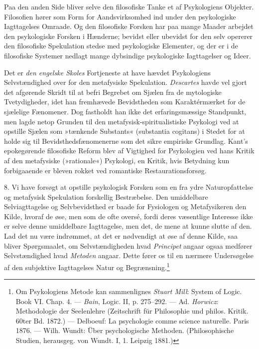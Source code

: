 \documentclass[12pt,a4paper,openany]{book}
\begin{document}
Paa den anden Side bliver selve den filosofiske Tanke et af Psykologiens
Objekter. Filosofien hører som Form for Aandsvirksomhed ind under den
psykologiske Iagttagelses Omraade. Og den filosofiske Forsken har paa
mange Maader arbejdet den psykologiske Forsken i Hænderne; bevidst eller
ubevidst for den selv opererer den filosofiske Spekulation stedse med
psykologiske Elementer, og der er i de filosofiske Systemer nedlagt
mange dybsindige psykologiske Iagttagelser og Ideer.

Det er \emph{den engelske Skoles} Fortjeneste at have hævdet
Psykologiens Selvstændighed over for den metafysiske Spekulation.
\emph{Descartes} havde vel gjort det afgørende Skridt til at befri
Begrebet om Sjælen fra de mytologiske Tvetydigheder, idet han fremhævede
Bevidstheden som Karaktérmærket for de sjælelige Fænomener. Dog
fastholdt han ikke det erfaringsmæssige Standpunkt, men lagde netop
Grunden til den metafysisk-spiritualistiske Psykologi ved at opstille
Sjælen som »tænkende Substants« (substantia cogitans) i Stedet for at
holde sig til Bevidsthedsfænomenerne som det sikre empiriske Grundlag.
Kant’s epokegørende filosofiske Reform blev af Vigtighed for Psykologien
ved hans Kritik af den metafysiske (»rationale«) Psykologi, en Kritik,
hvis Betydning kun forbigaaende er bleven rokket ved romantiske
Restaurationsforsøg.

8. Vi have forsøgt at opstille psykologisk Forsken som en fra ydre
Naturopfattelse og metafysisk Spekulation forskellig Bestræbelse. Den
umiddelbare Selviagttagelse og Selvbevidsthed er baade for Fysiologen og
Metafysikeren den Kilde, hvoraf de øse, men som de ofte oversé, fordi
deres væsentlige Interesse ikke er selve denne umiddelbare Iagttagelse,
men det, de mene at kunne slutte af den. Lad det nu være indrømmet, at
det er nødvendigt at øse af denne Kilde, saa bliver Spørgsmaalet, om
Selvstændigheden hvad \emph{Principet} angaar ogsaa medfører
Selvstændighed hvad \emph{Metoden} angaar. Dette fører os til en nærmere
Undersøgelse af den subjektive Iagttagelses Natur og
Begrænsning.\footnote[1]{Om Psykologiens Metode kan sammenlignes
\emph{Stuart Mill}: System of Logic. Book VI. Chap. 4. --- \emph{Bain}, Logic.
II, p. 275--292. --- Ad. \emph{Horwicz}: Methodologie der Seelenlehre
(Zeitschrift für Philosophie und philos. Kritik. 60ter Bd. 1872.) ---
Delboeuf: La psychologie comme science naturelle. Paris 1876. --- Wilh.
Wundt: Über psychologische Methoden. (Philosophische Studien, herausgeg.
von Wundt. I, 1. Leipzig 1881.)}
\end{document}

